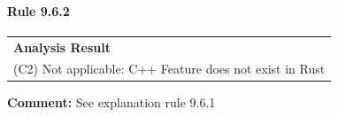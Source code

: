 \paragraph{Rule 9.6.2}
\begin{longtable}{p{13cm}}
\textbf{Analysis Result} \\
(C2) Not applicable: C++ Feature does not exist in Rust \\
\end{longtable}
\textbf{Comment:} See explanation rule 9.6.1 \\
